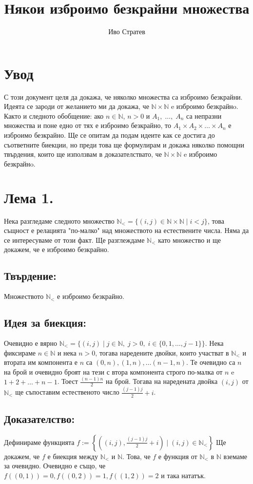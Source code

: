\documentclass[a4paper, 12pt, oneside]{article}
\title{Някои изброимо безкрайни множества}
\author{Иво Стратев}
\newcommand{\N}{\mathbb{N}}
\newcommand{\LN}{\N_<}
\begin{document}
\maketitle
\section*{Увод}
С този документ целя да докажа, че няколко множества са изброимо безкрайни.
Идеята се зароди от желанието ми да докажа, че \(\N\times\N\) e изброимо безкрайнo.
Както и следното обобщение: ако \(n \in \N\), \(n > 0\) и \(A_1, \; \dots, \; A_n\)
са непразни множества и поне едно от тях е изброимо безкрайно,
то \(A_1 \times A_2 \times \dots \times A_n\) е изброимо безкрайно.
Ще се опитам да подам идеите как се достига до съответните биекции,
но преди това ще формулирам и докажа няколко помощни твърдения,
които ще използвам в доказателствато, че \(\N\times\N\) e изброимо безкрайнo.
\section*{Лема 1.}
Нека разгледаме следното множество \(\LN = \{(i, j) \in \N\times\N \; | \; i < j\}\),
това същност е релацията "по-малко" над множеството на естествените числа.
Няма да се интересуваме от този факт. Ще разглеждаме \(\LN\) като множество и ще докажем,
че е изброимо безкрайно.
\subsection*{Твърдение:}
Множеството \(\LN\) е изброимо безкрайно.
\subsection*{Идея за биекция:}
Очевидно е вярно \(\LN = \{(i, j) \; | \; j \in \N, \; j > 0, \; i \in \{0, 1, \dots, j - 1\}\}\).
Нека фиксираме \(n \in \N\) и нека \(n > 0\), тогава наредените двойки, които участват в \(\LN\)
и втората им компонента е \(n\) са \((0, n), (1, n), \dots (n - 1, n)\).
Те очевидно са \(n\) на брой и очевидно броят на тези с втора компонента строго по-малка от \(n\)
e \(1 + 2 + \dots + n - 1\). Тоест \(\displaystyle\frac{(n - 1)n}{2}\) на брой.
Тогава на наредената двойка \((i, j)\) от \(\LN\) ще съпоставим естественото число \(\displaystyle\frac{(j - 1)j}{2} + i\). \\
\subsection*{Доказателство:}
Дефинираме функцията \(f := \left\{\left((i, j), \displaystyle\frac{(j - 1)j}{2} + i\right) \; \Big| \; (i, j) \in \LN \right\}\)
Ще докажем, че \(f\) е биекция между \(\LN\) и \(\N\). Това, че \(f\) е функция от \(\LN\) в \(\N\) вземаме за очевидно.
Очевидно е също, че \(f((0, 1)) = 0, f((0, 2)) = 1, f((1, 2)) = 2\) и така нататък.
\end{document}
